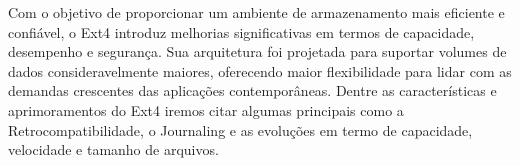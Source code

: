 \documentclass[
	12pt,				%
	openright,			%
	oneside,			%
	a4paper,			%
	chapter=TITLE,		%
	english,			%
	french,				%
	spanish,			%
	brazil				%
	]{abntex2}
\theoremstyle{definition}
\begin{document}
Com o objetivo de proporcionar um ambiente de armazenamento mais eficiente e confiável, o 
Ext4 introduz melhorias significativas em termos de capacidade, desempenho e segurança. 
Sua arquitetura foi projetada para suportar volumes de dados consideravelmente maiores, 
oferecendo maior flexibilidade para lidar com as demandas crescentes das aplicações contemporâneas. 
Dentre as características e aprimoramentos do Ext4 iremos citar algumas principais como a Retrocompatibilidade,
o Journaling e as evoluções em termo de capacidade, velocidade e tamanho de arquivos.



%

\end{document}
